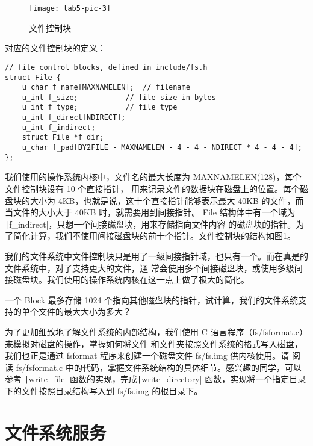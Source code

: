 \begin{figure}[htbp]
  \centering
  \texttt{[image: lab5-pic-3]}
  \caption{文件控制块}\label{lab5-pic-3}
\end{figure}

对应的文件控制块的定义：

\begin{verbatim}
// file control blocks, defined in include/fs.h
struct File {
    u_char f_name[MAXNAMELEN];  // filename
    u_int f_size;           // file size in bytes
    u_int f_type;           // file type
    u_int f_direct[NDIRECT];
    u_int f_indirect;
    struct File *f_dir;
    u_char f_pad[BY2FILE - MAXNAMELEN - 4 - 4 - NDIRECT * 4 - 4 - 4];
};
\end{verbatim}

我们使用的操作系统内核中，文件名的最大长度为 MAXNAMELEN(128)，每个文件控制块设有 10 个直接指针，
用来记录文件的数据块在磁盘上的位置。每个磁盘块的大小为 4KB，也就是说，这十个直接指针能够表示最大 40KB
的文件，而当文件的大小大于 40KB 时，就需要用到间接指针。
File 结构体中有一个域为 \texttt|f_indirect|，只想一个间接磁盘块，用来存储指向文件内容
的磁盘块的指针。为了简化计算，我们不使用间接磁盘块的前十个指针。文件控制块的结构如图\ref{lab5-pic-3}。

\begin{note}
我们的文件系统中文件控制块只是用了一级间接指针域，也只有一个。而在真是的文件系统中，对了支持更大的文件，通
常会使用多个间接磁盘块，或使用多级间接磁盘块。我们使用的操作系统内核在这一点上做了极大的简化。
\end{note}

\begin{thinking}\label{think-filesize}
一个 Block 最多存储 1024 个指向其他磁盘块的指针，试计算，我们的文件系统支持的单个文件的最大大小为多大？
\end{thinking}

为了更加细致地了解文件系统的内部结构，我们使用 C 语言程序（fs/fsformat.c）来模拟对磁盘的操作，掌握如何将文件
和文件夹按照文件系统的格式写入磁盘，我们也正是通过 fsformat 程序来创建一个磁盘文件 fs/fs.img 供内核使用。请
阅读 fs/fsformat.c 中的代码，掌握文件系统结构的具体细节。感兴趣的同学，可以参考 \texttt|write_file|
函数的实现，完成\texttt|write_directory| 函数，实现将一个指定目录下的文件按照目录结构写入到
fs/fs.img 的根目录下。

\section{文件系统服务}

